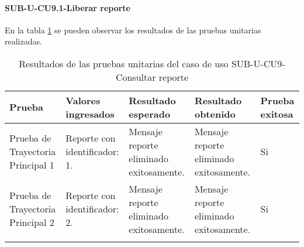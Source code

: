 \paragraph{SUB-U-CU9.1-Liberar reporte}\label{SUB-U-CU9.1:Pruebas}
En la tabla \ref{pruebas_unitarias_sub-u-cu9.1} se pueden observar los resultados de las pruebas unitarias realizadas.
\begin{longtable}{|M{2cm}| M{4.5cm}|M{3cm}|M{3cm}|M{1.5cm}|}
	\hline
	\textbf{Prueba} & \textbf{Valores ingresados} & \textbf{Resultado esperado} & \textbf{Resultado obtenido} & \textbf{Prueba exitosa} \\ \hline
	Prueba de Trayectoria Principal 1 & Reporte con identificador: 1.
	& 
	Mensaje reporte eliminado exitosamente.
	&
	Mensaje reporte eliminado exitosamente.
	& Si \\ \hline

	Prueba de Trayectoria Principal 2 & Reporte con identificador: 2.
	& 
	Mensaje reporte eliminado exitosamente.
	&
	Mensaje reporte eliminado exitosamente.
	& Si \\ \hline

	\caption{Resultados de las pruebas unitarias del caso de uso SUB-U-CU9-Consultar reporte}
	\label{pruebas_unitarias_sub-u-cu9.1}
\end{longtable}